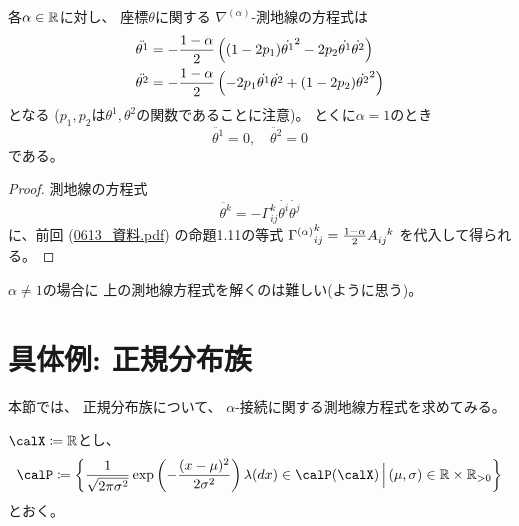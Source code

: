\documentclass[report]{jlreq}
\begin{document}
\begin{proposition}[$n = 3$での測地線方程式]
    各$\alpha \in \mathbb{R}$に対し、
    座標$\theta$に関する
    $\nabla^{(\alpha)}$-測地線の方程式は
    \begin{alignat}{1}
        \ddot{\theta^1}
            &=
                - \frac{1 - \alpha}{2}
                \left({
                    (1 - 2p_1) \dot{\theta^1}^2
                    - 2p_2 \dot{\theta^1} \dot{\theta^2}
                }\right)
                \\
        \ddot{\theta^2}
            &=
                - \frac{1 - \alpha}{2}
                \left({
                    - 2p_1 \dot{\theta^1} \dot{\theta^2}
                    + (1 - 2p_2) \dot{\theta^2}^2
                }\right)
    \end{alignat}
    となる ($p_1, p_2$は$\theta^1, \theta^2$の関数であることに注意)。
    とくに$\alpha = 1$のとき
    \begin{equation}
        \ddot{\theta^1} = 0,
            \quad
            \ddot{\theta^2} = 0
    \end{equation}
    である。
\end{proposition}

\begin{proof}
    測地線の方程式
    \begin{equation}
        \ddot{\theta^k}
            = - \Gamma_{ij}^k \dot{\theta^i} \dot{\theta^j}
    \end{equation}
    に、前回 (\url{0613_資料.pdf}) の命題1.11の等式
    ${\Gamma^{(\alpha)}}_{ij}^k = \frac{1 - \alpha}{2} A_{ij}^{\hphantom{ij}k}$
    を代入して得られる。
\end{proof}

$\alpha \neq 1$の場合に
上の測地線方程式を解くのは難しい(ように思う)。


%
\section{具体例: 正規分布族}

本節では、
正規分布族について、
$\alpha$-接続に関する測地線方程式を求めてみる。

\begin{settings}[正規分布族]
    $\calX \coloneqq \R$とし、
    \begin{equation}
        \calP \coloneqq \mybrace{
            \frac{1}{\sqrt{2 \pi \sigma^2}}
            \exp\myparen{
                - \frac{(x - \mu)^2}{2 \sigma^2}
            }
            \lambda(dx)
            \in \calP(\calX)
            \, \Big| \,
            (\mu, \sigma) \in \R \times \R_{> 0}
        }
    \end{equation}
    とおく。
\end{settings}
\end{document}
